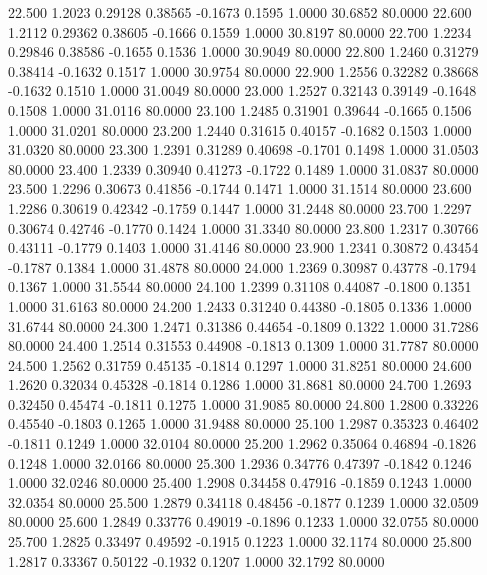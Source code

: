   22.500   1.2023   0.29128   0.38565  -0.1673   0.1595   1.0000  30.6852  80.0000
  22.600   1.2112   0.29362   0.38605  -0.1666   0.1559   1.0000  30.8197  80.0000
  22.700   1.2234   0.29846   0.38586  -0.1655   0.1536   1.0000  30.9049  80.0000
  22.800   1.2460   0.31279   0.38414  -0.1632   0.1517   1.0000  30.9754  80.0000
  22.900   1.2556   0.32282   0.38668  -0.1632   0.1510   1.0000  31.0049  80.0000
  23.000   1.2527   0.32143   0.39149  -0.1648   0.1508   1.0000  31.0116  80.0000
  23.100   1.2485   0.31901   0.39644  -0.1665   0.1506   1.0000  31.0201  80.0000
  23.200   1.2440   0.31615   0.40157  -0.1682   0.1503   1.0000  31.0320  80.0000
  23.300   1.2391   0.31289   0.40698  -0.1701   0.1498   1.0000  31.0503  80.0000
  23.400   1.2339   0.30940   0.41273  -0.1722   0.1489   1.0000  31.0837  80.0000
  23.500   1.2296   0.30673   0.41856  -0.1744   0.1471   1.0000  31.1514  80.0000
  23.600   1.2286   0.30619   0.42342  -0.1759   0.1447   1.0000  31.2448  80.0000
  23.700   1.2297   0.30674   0.42746  -0.1770   0.1424   1.0000  31.3340  80.0000
  23.800   1.2317   0.30766   0.43111  -0.1779   0.1403   1.0000  31.4146  80.0000
  23.900   1.2341   0.30872   0.43454  -0.1787   0.1384   1.0000  31.4878  80.0000
  24.000   1.2369   0.30987   0.43778  -0.1794   0.1367   1.0000  31.5544  80.0000
  24.100   1.2399   0.31108   0.44087  -0.1800   0.1351   1.0000  31.6163  80.0000
  24.200   1.2433   0.31240   0.44380  -0.1805   0.1336   1.0000  31.6744  80.0000
  24.300   1.2471   0.31386   0.44654  -0.1809   0.1322   1.0000  31.7286  80.0000
  24.400   1.2514   0.31553   0.44908  -0.1813   0.1309   1.0000  31.7787  80.0000
  24.500   1.2562   0.31759   0.45135  -0.1814   0.1297   1.0000  31.8251  80.0000
  24.600   1.2620   0.32034   0.45328  -0.1814   0.1286   1.0000  31.8681  80.0000
  24.700   1.2693   0.32450   0.45474  -0.1811   0.1275   1.0000  31.9085  80.0000
  24.800   1.2800   0.33226   0.45540  -0.1803   0.1265   1.0000  31.9488  80.0000
  25.100   1.2987   0.35323   0.46402  -0.1811   0.1249   1.0000  32.0104  80.0000
  25.200   1.2962   0.35064   0.46894  -0.1826   0.1248   1.0000  32.0166  80.0000
  25.300   1.2936   0.34776   0.47397  -0.1842   0.1246   1.0000  32.0246  80.0000
  25.400   1.2908   0.34458   0.47916  -0.1859   0.1243   1.0000  32.0354  80.0000
  25.500   1.2879   0.34118   0.48456  -0.1877   0.1239   1.0000  32.0509  80.0000
  25.600   1.2849   0.33776   0.49019  -0.1896   0.1233   1.0000  32.0755  80.0000
  25.700   1.2825   0.33497   0.49592  -0.1915   0.1223   1.0000  32.1174  80.0000
  25.800   1.2817   0.33367   0.50122  -0.1932   0.1207   1.0000  32.1792  80.0000
